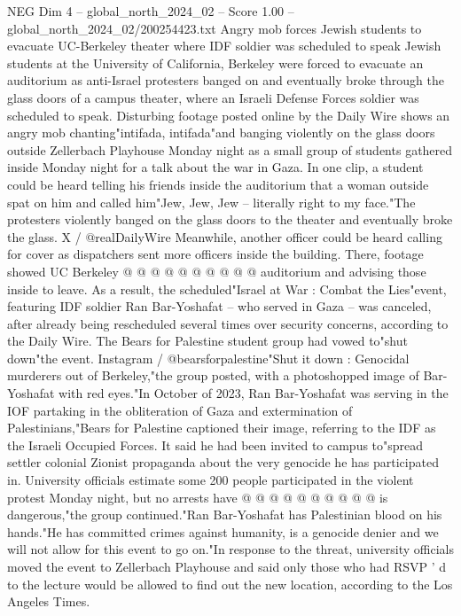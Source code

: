 \begin{textsample}{NEG Dim 4 – global\_north\_2024\_02 – Score 1.00 – global\_north\_2024\_02/200254423.txt}  \label{ex:f4_neg_279}
Angry mob forces Jewish students to evacuate UC-Berkeley theater where IDF soldier was scheduled to speak Jewish students at the University of California, Berkeley were forced to evacuate an auditorium as anti-Israel protesters banged on and eventually broke through the glass doors of a campus theater, where an Israeli Defense Forces soldier was scheduled to speak.
Disturbing footage posted online by the Daily Wire shows an angry mob chanting"intifada, intifada"and banging violently on the glass doors outside Zellerbach Playhouse Monday night as a small group of students gathered inside Monday night for a talk about the war in Gaza.
In one clip, a student could be heard telling his friends inside the auditorium that a woman outside spat on him and called him"Jew, Jew, Jew -- literally right to my face."The protesters violently banged on the glass doors to the theater and eventually broke the glass.
X / @realDailyWire Meanwhile, another officer could be heard calling for cover as dispatchers sent more officers inside the building.
There, footage showed UC Berkeley @ @ @ @ @ @ @ @ @ @ auditorium and advising those inside to leave.
As a result, the scheduled"Israel at War : Combat the Lies"event, featuring IDF soldier Ran Bar-Yoshafat -- who served in Gaza -- was canceled, after already being rescheduled several times over security concerns, according to the Daily Wire.
The Bears for Palestine student group had vowed to"shut down"the event.
Instagram / @bearsforpalestine"Shut it down : Genocidal murderers out of Berkeley,"the group posted, with a photoshopped image of Bar-Yoshafat with red eyes."In October of 2023, Ran Bar-Yoshafat was serving in the IOF partaking in the obliteration of Gaza and extermination of Palestinians,"Bears for Palestine captioned their image, referring to the IDF as the Israeli Occupied Forces.
It said he had been invited to campus to"spread settler colonial Zionist propaganda about the very genocide he has participated in.
University officials estimate some 200 people participated in the violent protest Monday night, but no arrests have @ @ @ @ @ @ @ @ @ @ is dangerous,"the group continued."Ran Bar-Yoshafat has Palestinian blood on his hands."He has committed crimes against humanity, is a genocide denier and we will not allow for this event to go on."In response to the threat, university officials moved the event to Zellerbach Playhouse and said only those who had RSVP ' d to the lecture would be allowed to find out the new location, according to the Los Angeles Times.

\end{textsample}
